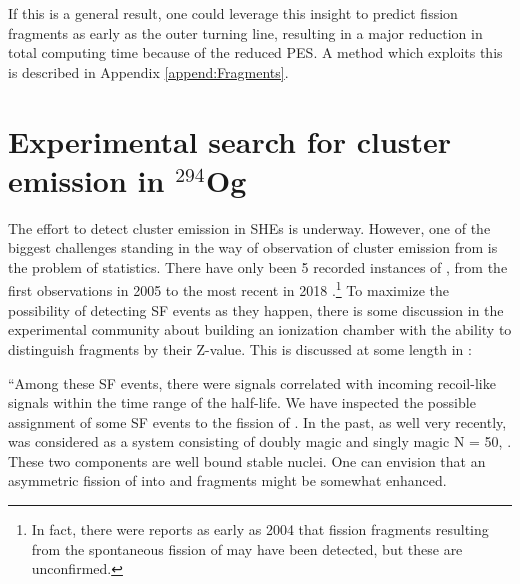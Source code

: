 If this is a general result, one could leverage this insight to predict fission fragments as early as the outer turning line, resulting in a major reduction in total computing time because of the reduced PES. A method which exploits this is described in Appendix \ref{append:Fragments}. %


\section{Experimental search for cluster emission in $^{294}$Og}

The effort to detect cluster emission in SHEs is underway. However, one of the biggest challenges standing in the way of observation of cluster emission from {\Og} is the problem of statistics. There have only been 5 recorded instances of {\Og}, from the first observations in 2005 \cite{Oganessian2006} to the most recent in 2018 \cite{Brewer2018}.\footnote{In fact, there were reports as early as 2004 \cite{Oganessian2004} that fission fragments resulting from the spontaneous fission of {\Og} may have been detected, but these are unconfirmed.} To maximize the possibility of detecting SF events as they happen, there is some discussion in the experimental community about building an ionization chamber with the ability to distinguish fragments by their Z-value. This is discussed at some length in \cite{Brewer2018}:

``Among these SF events, there were signals correlated with incoming recoil-like signals within the time range of the {\Og} half-life. We have inspected the possible assignment of some SF events to the fission of {\Og}. In the past, as well very recently, {\Og} was considered as a system consisting of doubly magic {\Pb} and singly magic N = 50, {\Kr}. These two components are well bound stable nuclei. One can envision that an asymmetric fission of {\Og} into {\Pb} and {\Kr} fragments might be somewhat enhanced.


